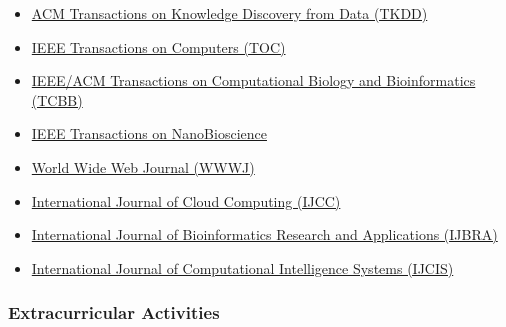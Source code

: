 \documentclass[]{article}
\begin{document}
\begin{itemize}
\itemsep1pt\parskip0pt
\item
  \href{http://tkdd.acm.org/}{ACM Transactions on Knowledge Discovery
  from Data (TKDD)}
\item
  \href{http://www.computer.org/portal/web/tc}{IEEE Transactions on
  Computers (TOC)}
\item
  \href{http://www.computer.org/portal/web/tcbb}{IEEE/ACM Transactions
  on Computational Biology and Bioinformatics (TCBB)}
\item
  \href{http://ieeexplore.ieee.org/xpl/RecentIssue.jsp?punumber=7728}{IEEE
  Transactions on NanoBioscience}
\item
  \href{http://www.editorialmanager.com/wwwj/}{World Wide Web Journal
  (WWWJ)}
\item
  \href{http://www.inderscience.com/jhome.php?jcode=ijcc}{International
  Journal of Cloud Computing (IJCC)}
\item
  \href{http://www.inderscience.com/jhome.php?jcode=ijbra}{International
  Journal of Bioinformatics Research and Applications (IJBRA)}
\item
  \href{http://www.atlantis-press.com/publications/ijcis/}{International
  Journal of Computational Intelligence Systems (IJCIS)}
\end{itemize}

\subsubsection{Extracurricular
Activities}\label{extracurricular-activities}

\renewenvironment{description}{
  \begin{basedescript}{\desclabelstyle{\pushlabel}\desclabelwidth{5em}}
}{
  \end{basedescript}
}
\end{document}
